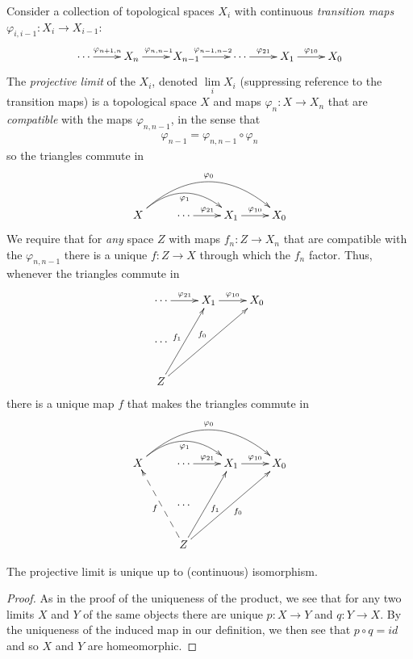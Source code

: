       \begin{defn}
        \label{defn:projlim}
        Consider a collection of topological spaces $X_i$ with continuous \emph{transition maps} $\varphi_{i,i-1}:X_i\rightarrow X_{i-1}$:
        \begin{displaymath}
          \xymatrix{
            \cdots \ar[r]^{\varphi_{n+1,n}} & X_n \ar[r]^{\varphi_{n,n-1}} & X_{n-1} \ar[r]^{\varphi_{n-1,n-2}} & \cdots \ar[r]^{\varphi_{21}} & X_1 \ar[r]^{\varphi_{10}} & X_0
          }
        \end{displaymath}
        The \emph{projective limit} of the $X_i$, denoted $\lim\limits_i X_i$ (suppressing reference to the transition maps) is a topological space $X$ and maps $\varphi_n:X\rightarrow X_n$ that are \emph{compatible} with the maps $\varphi_{n,n-1}$, in the sense that 
        \begin{align*}
          \varphi_{n-1}=\varphi_{n,n-1}\circ\varphi_n
        \end{align*}
        so the triangles commute in
        \begin{displaymath}
          \xymatrix{
            X \ar@/^20pt/[rr]_{\varphi_1} \ar@/^30pt/[rrr]^{\varphi_0}
            & \cdots \ar[r]^{\varphi_{21}}
            & X_1 \ar[r]^{\varphi_{10}}
            & X_0
          }
        \end{displaymath}
        We require that for \emph{any} space $Z$ with maps $f_n:Z\rightarrow X_n$ that are compatible with the $\varphi_{n,n-1}$ there is a unique $f:Z\rightarrow X$ through which the $f_n$ factor.
        Thus, whenever the triangles commute in
        \begin{displaymath}
          \xymatrix{
             \cdots \ar[r]^{\varphi_{21}}
            & X_1 \ar[r]^{\varphi_{10}}
            & X_0
            \\ \cdots \\
            Z \ar[uur]^{f_1} \ar[uurr]^{f_0}
          }
        \end{displaymath}
        there is a unique map $f$ that makes the triangles commute in
        \begin{displaymath}
          \xymatrix{
            X \ar@/^20pt/[rr]_{\varphi_1} \ar@/^30pt/[rrr]^{\varphi_0}
            & \cdots \ar[r]^{\varphi_{21}}
            & X_1 \ar[r]^{\varphi_{10}}
            & X_0
            \\ & \cdots \\
            & Z \ar@{-->}[uul]^f \ar[uur]_{f_1} \ar[uurr]_{f_0}
          }
        \end{displaymath}
      \end{defn}
      \begin{claim}
        The projective limit is unique up to (continuous) isomorphism.
        \begin{proof}
          As in the proof of the uniqueness of the product, we see that for any two limits $X$ and $Y$ of the same objects there are unique $p:X\rightarrow Y$ and $q:Y\rightarrow X$.
          By the uniqueness of the induced map in our definition, we then see that $p\circ q=id$ and so $X$ and $Y$ are homeomorphic.
        \end{proof}
      \end{claim}

